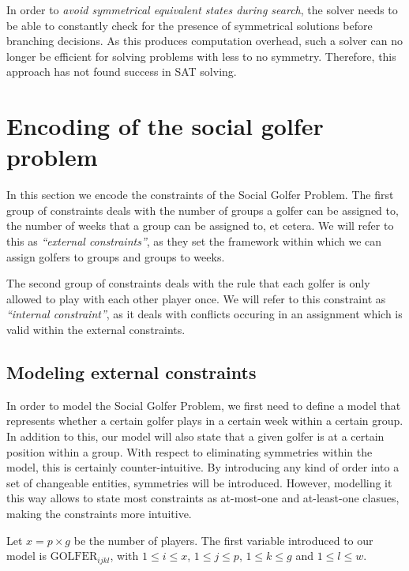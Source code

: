 \documentclass[a4paper]{scrartcl}
\begin{document}
In order to \emph{avoid symmetrical equivalent states during search}, the solver needs to be able to constantly check for the presence of symmetrical solutions before branching decisions. As this produces computation overhead, such a solver can no longer be efficient for solving problems with less to no symmetry. Therefore, this approach has not found success in SAT solving.

\section{Encoding of the social golfer problem}

In this section we encode the constraints of the Social Golfer Problem. The first group of constraints deals with the number of groups a golfer can be assigned to, the number of weeks that a group can be assigned to, et cetera. We will refer to this as \emph{``external constraints''}, as they set the framework within which we can assign golfers to groups and groups to weeks.

The second group of constraints deals with the rule that each golfer is only allowed to play with each other player once. We will refer to this constraint as \emph{``internal constraint''}, as it deals with conflicts occuring in an assignment which is valid within the external constraints.


\subsection{Modeling external constraints}

In order to model the Social Golfer Problem, we first need to define a model that represents whether a certain golfer plays in a certain week within a certain group. In addition to this, our model will also state that a given golfer is at a certain position within a group. With respect to eliminating symmetries within the model, this is certainly counter-intuitive. By introducing any kind of order into a set of changeable entities, symmetries will be introduced. However, modelling it this way allows to state most constraints as at-most-one and at-least-one clasues, making the constraints more intuitive.

Let $x = p \times g$ be the number of players. The first variable introduced to our model is $\text{GOLFER}_{ijkl}$, with $1 \leq i \leq x$, $1 \leq j \leq p$, $1 \leq k \leq g$ and $1 \leq l \leq w$.
\end{document}
